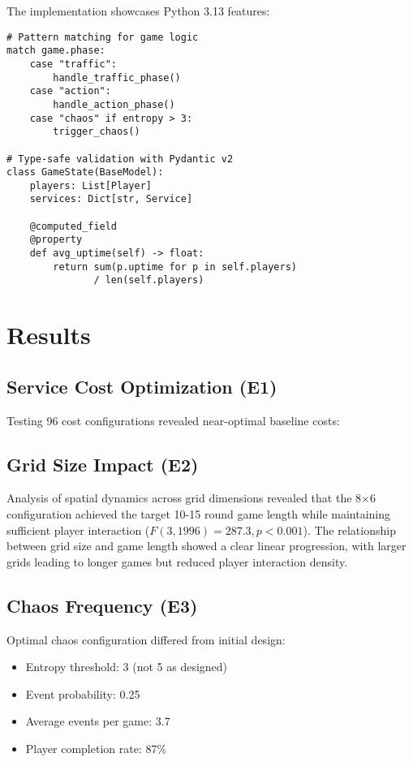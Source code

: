 \documentclass[sigconf]{acmart}
\begin{document}
The implementation showcases Python 3.13 features:

\begin{verbatim}
# Pattern matching for game logic
match game.phase:
    case "traffic": 
        handle_traffic_phase()
    case "action": 
        handle_action_phase()
    case "chaos" if entropy > 3: 
        trigger_chaos()

# Type-safe validation with Pydantic v2
class GameState(BaseModel):
    players: List[Player]
    services: Dict[str, Service]
    
    @computed_field
    @property
    def avg_uptime(self) -> float:
        return sum(p.uptime for p in self.players) 
               / len(self.players)
\end{verbatim}

\section{Results}

\subsection{Service Cost Optimization (E1)}

Testing 96 cost configurations revealed near-optimal baseline costs:



\subsection{Grid Size Impact (E2)}

Analysis of spatial dynamics across grid dimensions revealed that the 8×6 configuration achieved the target 10-15 round game length while maintaining sufficient player interaction ($F(3,1996) = 287.3, p < 0.001$). The relationship between grid size and game length showed a clear linear progression, with larger grids leading to longer games but reduced player interaction density.

\subsection{Chaos Frequency (E3)}

Optimal chaos configuration differed from initial design:

\begin{itemize}
\item Entropy threshold: 3 (not 5 as designed)
\item Event probability: 0.25
\item Average events per game: 3.7
\item Player completion rate: 87\%
\end{itemize}
\end{document}
